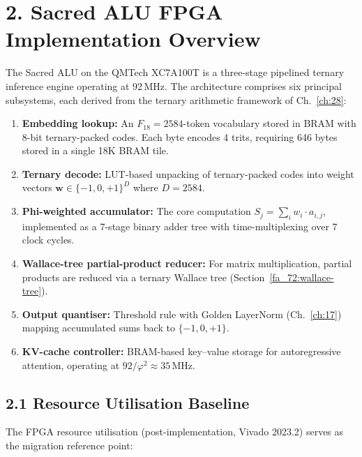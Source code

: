 \section{2. Sacred ALU FPGA Implementation Overview}\label{fa_72:fpga-overview}

The Sacred ALU on the QMTech XC7A100T is a three-stage pipelined
ternary inference engine operating at 92\,MHz. The architecture
comprises six principal subsystems, each derived from the ternary
arithmetic framework of Ch.~\ref{ch:28}:

\begin{enumerate}
\tightlist
\item \textbf{Embedding lookup:} An \(F_{18} = 2584\)-token vocabulary
      stored in BRAM with 8-bit ternary-packed codes. Each byte encodes
      4 trits, requiring 646 bytes stored in a single 18K BRAM tile.
\item \textbf{Ternary decode:} LUT-based unpacking of ternary-packed
      codes into weight vectors \(\mathbf{w} \in \{-1,0,+1\}^D\)
      where \(D = 2584\).
\item \textbf{Phi-weighted accumulator:} The core computation
      \(S_j = \sum_{i} w_i \cdot a_{i,j}\), implemented as a 7-stage
      binary adder tree with time-multiplexing over 7 clock cycles.
\item \textbf{Wallace-tree partial-product reducer:} For matrix
      multiplication, partial products are reduced via a ternary
      Wallace tree (Section~\ref{fa_72:wallace-tree}).
\item \textbf{Output quantiser:} Threshold rule with Golden LayerNorm
      (Ch.~\ref{ch:17}) mapping accumulated sums back to
      \(\{-1,0,+1\}\).
\item \textbf{KV-cache controller:} BRAM-based key--value storage
      for autoregressive attention, operating at
      \(92/\varphi^2 \approx 35\)\,MHz.
\end{enumerate}

\subsection{2.1 Resource Utilisation Baseline}

The FPGA resource utilisation (post-implementation, Vivado 2023.2)
serves as the migration reference point:

